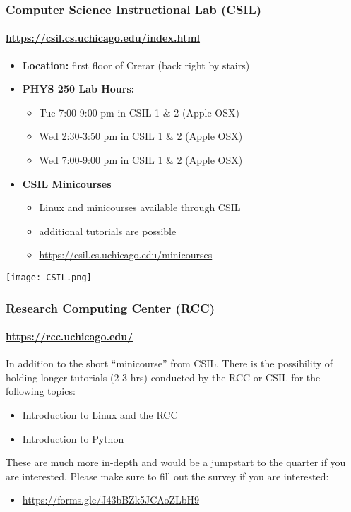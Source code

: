 \documentclass[hyperref={colorlinks=true}]{beamer}
\begin{document}
\begin{frame}%
  \frametitle{Computer Science Instructional Lab (CSIL)}
  \framesubtitle{\url{https://csil.cs.uchicago.edu/index.html}}

  \begin{itemize}
    \item \textbf{Location:} first floor of Crerar (back right by stairs)
    \item \textbf{PHYS 250 Lab Hours:}
    \begin{itemize}
      \item Tue 7:00-9:00 pm in CSIL 1 \& 2 (Apple OSX)
      \item Wed 2:30-3:50 pm in CSIL 1 \& 2 (Apple OSX)
      \item Wed 7:00-9:00 pm in CSIL 1 \& 2 (Apple OSX)
    \end{itemize}
    \item \textbf{CSIL Minicourses}    
    \begin{itemize}
      \item Linux and \git minicourses available through CSIL
      \item additional tutorials are possible
      \item \url{https://csil.cs.uchicago.edu/minicourses}
    \end{itemize}
  \end{itemize}
    
  \centering \texttt{[image: CSIL.png]}
    
\end{frame}


\begin{frame}%
  \frametitle{Research Computing Center (RCC)}
  \framesubtitle{\url{https://rcc.uchicago.edu/}}

  In addition to the short ``minicourse'' from CSIL, There is the possibility of holding longer tutorials (2-3 hrs) conducted by the RCC or CSIL for the following topics:

  \begin{itemize}
    \item Introduction to Linux and the RCC
    \item Introduction to Python
  \end{itemize}
    
  These are much more in-depth and would be a jumpstart to the quarter if you are interested. Please make sure to fill out the survey if you are interested:
  
  \begin{itemize}
    \item \url{https://forms.gle/J43bBZk5JCAoZLbH9}
  \end{itemize}
    
\end{frame}
\end{document}
